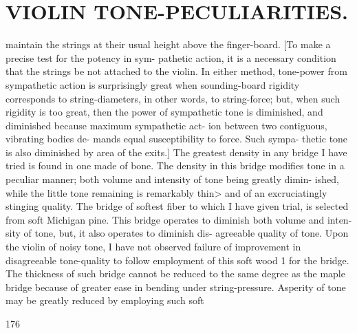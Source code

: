 \documentclass{article}
\begin{document}
\section*{VIOLIN TONE-PECULIARITIES.}
maintain the strings at their usual height above the finger-board. [To make a precise test for the potency in sym- pathetic action, it is a necessary condition that the strings be not attached to the violin. In either method, tone-power from sympathetic action is surprisingly great when sounding-board rigidity corresponds to string-diameters, in other words, to string-force; but, when such rigidity is too great, then the power of sympathetic tone is diminished, and diminished because maximum sympathetic act- ion between two contiguous, vibrating bodies de- mands equal susceptibility to force. Such sympa- thetic tone is also diminished by area of the exits.] The greatest density in any bridge I have tried is found in one made of bone. The density in this bridge modifies tone in a peculiar manner; both volume and intensity of tone being greatly dimin- ished, while the little tone remaining is remarkably thin> and of an excruciatingly stinging quality. The bridge of softest fiber to which I have given trial, is selected from soft Michigan pine. This bridge operates to diminish both volume and inten- sity of tone, but, it also operates to diminish dis- agreeable quality of tone. Upon the violin of noisy tone, I have not observed failure of improvement in disagreeable tone-quality to follow employment of this soft wood 1 for the bridge. The thickness of such bridge cannot be reduced to the same degree as the maple bridge because of greater ease in bending under string-pressure. Asperity of tone may be greatly reduced by employing such soft

176
\end{document}
